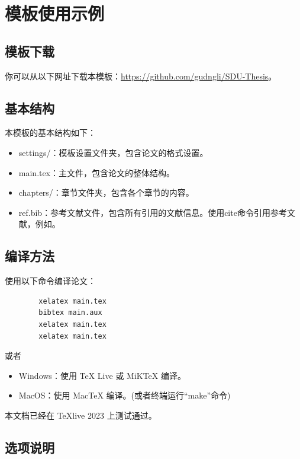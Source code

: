 \documentclass{settings/sdu-thesis}
\begin{document}
\maketitlepagestatement

\content



\ftcontent

\chapter{模板使用示例}
\section{模板下载}
你可以从以下网址下载本模板：\url{https://github.com/gudngli/SDU-Thesis}。

\section{基本结构}
本模板的基本结构如下：
\begin{itemize}
    \item settings/：模板设置文件夹，包含论文的格式设置。
    \item main.tex：主文件，包含论文的整体结构。
    \item chapters/：章节文件夹，包含各个章节的内容。
    \item ref.bib：参考文献文件，包含所有引用的文献信息。使用cite命令引用参考文献，例如\cite{MSR-TIT24}。
\end{itemize}

\section{编译方法}
使用以下命令编译论文：
    \begin{verbatim}
        xelatex main.tex
        bibtex main.aux
        xelatex main.tex
        xelatex main.tex
    \end{verbatim}
或者
\begin{itemize}
    \item Windows：使用 TeX Live 或 MiKTeX 编译。
    \item MacOS：使用 MacTeX 编译。(或者终端运行``make''命令)
\end{itemize}
本文档已经在 TeXlive 2023 上测试通过。

\section{选项说明}
\end{document}
